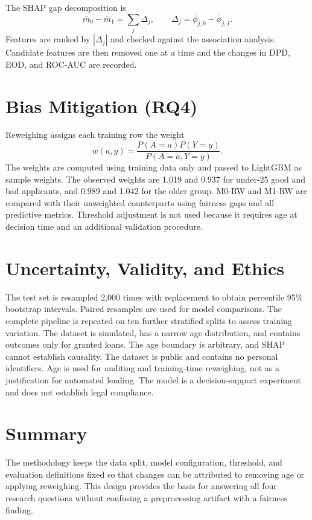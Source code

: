 The SHAP gap decomposition is
\begin{equation}
\overline{m}_0-\overline{m}_1=\sum_j\Delta_j,\qquad
\Delta_j=\overline{\phi}_{j,0}-\overline{\phi}_{j,1}.
\end{equation}
Features are ranked by $|\Delta_j|$ and checked against the association
analysis. Candidate features are then removed one at a time and the changes
in DPD, EOD, and ROC-AUC are recorded.

\section{Bias Mitigation (RQ4)}

Reweighing assigns each training row the weight
\begin{equation}
w(a,y)=\frac{P(A=a)P(Y=y)}{P(A=a,Y=y)}.
\end{equation}
The weights are computed using training data only and passed to LightGBM as
sample weights. The observed weights are 1.019 and 0.937 for under-25 good
and bad applicants, and 0.989 and 1.042 for the older group. M0-RW and M1-RW
are compared with their unweighted counterparts using fairness gaps and all
predictive metrics. Threshold adjustment is not used because it requires
age at decision time and an additional validation procedure.

\section{Uncertainty, Validity, and Ethics}

The test set is resampled 2,000 times with replacement to obtain percentile
95\% bootstrap intervals. Paired resamples are used for model comparisons.
The complete pipeline is repeated on ten further stratified splits to assess
training variation. The dataset is simulated, has a narrow age distribution,
and contains outcomes only for granted loans. The age boundary is arbitrary,
and SHAP cannot establish causality. The dataset is public and contains no
personal identifiers. Age is used for auditing and training-time reweighing,
not as a justification for automated lending. The model is a decision-support
experiment and does not establish legal compliance.

\section{Summary}

The methodology keeps the data split, model configuration, threshold, and
evaluation definitions fixed so that changes can be attributed to removing age
or applying reweighing. This design provides the basis for answering all four
research questions without confusing a preprocessing artifact with a fairness
finding.
